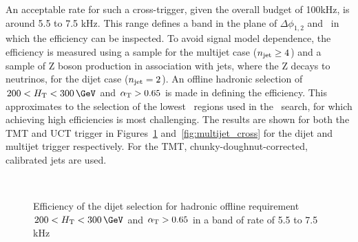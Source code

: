 An acceptable rate for such a cross-trigger, given the overall budget of 100kHz, is 
around 5.5 to 7.5 kHz. This range defines a band in the plane of $\Delta\phi_{1,2}$
and \scalht~in which the efficiency can be inspected. To avoid signal model dependence, the 
efficiency is measured using a \ttbar sample for the multijet case ($n_{\mathrm{jet}} \ge 4$) and a sample  
of Z boson production in association with jets, where the Z decays to neutrinos, for the 
dijet case ($n_{\mathrm{jet}} = 2$). An offline hadronic selection of $200 < \scalht < 300\,\GeV$ 
and $\alpha_{\text{T}} > 0.65$ is made in defining the efficiency. This approximates to the selection
of the lowest \scalht~regions used in the \alphat~search, for which achieving high efficiencies is most challenging.
The results are shown for both the TMT and UCT trigger in Figures~\ref{fig:dijet_cross} and~\ref{fig:multijet_cross} 
for the dijet and multijet trigger respectively. For the TMT, chunky-doughnut-corrected, calibrated jets are used.

\begin{figure}
\centering
	~
	\caption{Efficiency of the dijet selection for hadronic offline requirement $200 < \scalht < 300\,\GeV$ and $\alpha_{\text{T}} > 0.65$
	in a band of rate of 5.5 to 7.5 kHz}
	    \label{fig:dijet_cross}
\end{figure}

